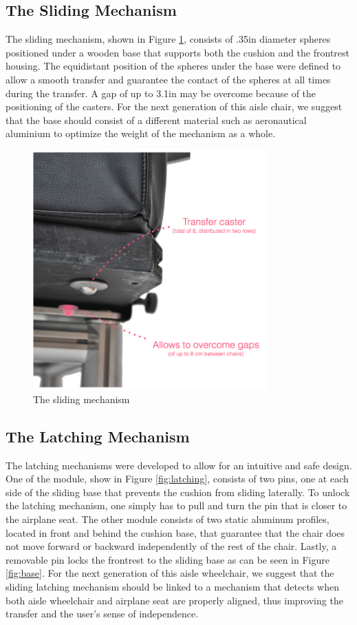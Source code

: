 \subsection{The Sliding Mechanism}

The sliding mechanism, shown in Figure \ref{fig:sliding},  consists of .35in diameter spheres positioned under a wooden base that supports both the cushion and the frontrest housing. The equidistant position of the spheres under the base were defined to allow a smooth transfer and  guarantee the contact of the spheres at all times during the transfer. A gap of up to 3.1in may be overcome because of the positioning of the casters. For the next generation of this aisle chair, we suggest that the base should consist of a different material such as aeronautical aluminium to optimize the weight of the mechanism as a whole.

\begin{figure}[h]
\centering
\includegraphics[width=9cm]{images/AisleWheelchair3.png}
\caption{The sliding mechanism}
\label{fig:sliding}
\end{figure}

\subsection{The Latching Mechanism}

The latching mechanisms were developed to allow for an intuitive and safe design. One of the module, show in Figure \ref{fig:latching},  consists of two pins, one at each side of the sliding base that prevents the cushion from sliding laterally. To unlock the latching mechanism, one simply has to pull and turn the pin that is closer to the airplane seat. The other module consists of two static aluminum profiles, located in front and behind the cushion base, that guarantee that the chair does not move forward or backward independently of the rest of the chair. Lastly, a removable pin locks the frontrest to the sliding base as can be seen in Figure \ref{fig:base}.
	For the next generation of this aisle wheelchair, we suggest that the sliding latching mechanism should be linked to a mechanism that detects when both aisle wheelchair and airplane seat are properly aligned, thus improving the transfer and the user's sense of independence.

